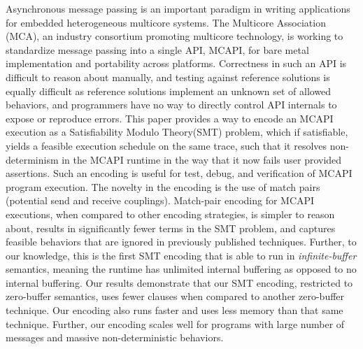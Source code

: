Asynchronous message passing is an important paradigm in writing
applications for embedded heterogeneous multicore systems.  The
Multicore Association (MCA), an industry consortium promoting
multicore technology, is working to standardize message passing into a
single API, MCAPI, for bare metal implementation and portability
across platforms.  Correctness in such an API is difficult to reason
about manually, and testing against reference solutions is equally
difficult as reference solutions implement an unknown set of allowed
behaviors, and programmers have no way to directly control API
internals to expose or reproduce errors.  This paper provides a way to encode an MCAPI
execution as a Satisfiability Modulo Theory(SMT) problem, which if satisfiable, yields a feasible
execution schedule on the same trace,
such that it resolves non-determinism in the MCAPI runtime in the way that it now fails user provided assertions.
Such an encoding is useful for test, debug, and
verification of MCAPI program execution.  The novelty in the encoding
is the use of match pairs (potential send and receive couplings).  Match-pair encoding for
MCAPI executions, when compared to other encoding strategies, is
simpler to reason about, results in significantly fewer terms in the
SMT problem, and captures feasible behaviors that are ignored in
previously published techniques. Further, to our knowledge, this is the first SMT encoding  that is able to run in \textit{infinite-buffer} semantics, meaning the runtime has unlimited internal buffering as opposed to no internal buffering. %
Our results demonstrate that our SMT encoding, restricted to zero-buffer semantics, uses fewer clauses when compared to another zero-buffer technique. Our encoding also runs faster and uses less memory than that same technique. Further, our encoding scales well for programs with large number of messages and massive non-deterministic behaviors.

